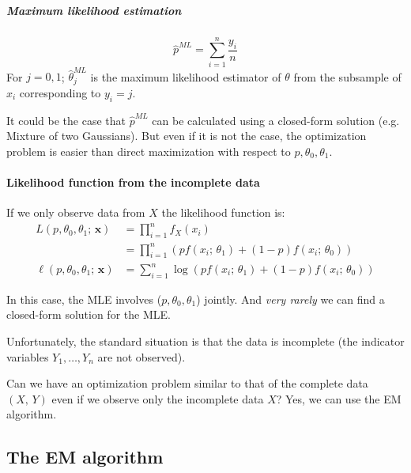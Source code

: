 \subparagraph{Maximum likelihood estimation}
\begin{equation*}
	\hat{p}^{ML} = \sum_{i=1}^n \frac{y_i}{n}
\end{equation*}
For $j = 0,1$; $\hat{\theta}_j^{ML}$ is the maximum likelihood estimator of $\theta$ from the subsample
of $x_i$ corresponding to $y_i = j$.

\begin{note}
	It could be the case that $\hat{p}^{ML}$ can be calculated using a closed-form solution
	(e.g. Mixture of two Gaussians). But even if it is not the case, the optimization
	problem is easier than direct maximization with respect to $p,\theta_0,\theta_1$.
\end{note}

\paragraph{Likelihood function from the incomplete data}

If we only observe data from $X$ the likelihood function is:
\begin{align*}
	L(p,\theta_0,\theta_1;\,\boldsymbol x)    & = \prod_{i=1}^n f_X(x_i)                                                         \\
	                                          & = \prod_{i=1}^n \left( p f(x_i;\,\theta_1) + (1-p) f(x_i;\,\theta_0) \right)     \\[1em]
	\ell(p,\theta_0,\theta_1;\,\boldsymbol x) & = \sum_{i=1}^n \log \left( p f(x_i;\,\theta_1) + (1-p) f(x_i;\,\theta_0) \right)
\end{align*}

In this case, the MLE involves ($p,\theta_0,\theta_1$) jointly.
And \emph{very rarely} we can find a closed-form solution for the MLE.

Unfortunately, the standard situation is that the data is incomplete
(the indicator variables $Y_1,\dots,Y_n$ are not observed).

\begin{question}{Can we have an optimization problem similar to that of the complete data
		$(X,\,Y)$ even if we observe only the incomplete data $X$?}{}
	Yes, we can use the EM algorithm.
\end{question}

\subsection{The EM algorithm}

